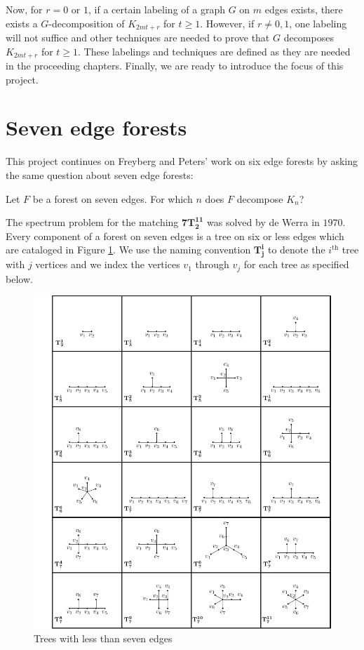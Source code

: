 Now, for $r=0$ or $1$, if a certain labeling of a graph $G$ on $m$ edges exists, there exists a $G$-decomposition of $K_{2mt+r}$ for $t\geq 1$. However, if $r\neq 0,1$, one labeling will not suffice and other techniques are needed to prove that $G$ decomposes $K_{2mt+r}$ for $t\geq 1$. These labelings and techniques are defined as they are needed in the proceeding chapters. Finally, we are ready to introduce the focus of this project.
\section{Seven edge forests}
This project continues on Freyberg and Peters' work on six edge forests by asking the same question about seven edge forests:
\begin{center}
  Let $F$ be a forest on seven edges. For which $n$ does $F$ decompose $K_{n}$? 
\end{center}
The spectrum problem for the matching $\mathbf{7T_{2}^{11}}$ was solved by de Werra in $1970$. Every component of a forest on seven edges is a tree on six or less edges which are cataloged in Figure \ref{fig:catalog}. We use the naming convention $\mathbf{T_{j}^i}$ to denote the $i^{\textrm{th}}$ tree with $j$ vertices and we index the vertices $v_{1}$ through $v_{j}$ for each tree as specified below.

\begin{figure}[H]
\begin{center}
\includegraphics[scale=0.85]{standalone/tree chart.pdf}
\end{center}
\caption{Trees with less than seven edges}
\label{fig:catalog}
\end{figure}

